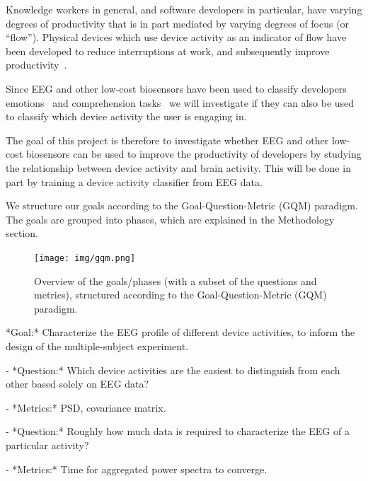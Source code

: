 \documentclass{IEEEtran}
\begin{document}
\begin{refsection}

Knowledge workers in general, and software developers in particular, have varying degrees of productivity that is in part mediated by varying degrees of focus (or ``flow''). Physical devices which use device activity as an indicator of flow have been developed to reduce interruptions at work, and subsequently improve productivity~\cite{zuger_reducing_2017}.


Since EEG and other low-cost biosensors have been used to classify developers emotions~\cite{girardi_recognizing_2020} and comprehension tasks~\cite{fucci_replication_2019} we will investigate if they can also be used to classify which device activity the user is engaging in.

The goal of this project is therefore to investigate whether EEG and other low-cost biosensors can be used to improve the productivity of developers by studying the relationship between device activity and brain activity. This will be done in part by training a device activity classifier from EEG data. %

We structure our goals according to the Goal-Question-Metric (GQM) paradigm. The goals are grouped into phases, which are explained in the Methodology section.

\begin{figure}[h]
\centering
\texttt{[image: img/gqm.png]}
    \caption{Overview of the goals/phases (with a subset of the questions and metrics), structured according to the Goal-Question-Metric (GQM) paradigm.}\label{fig:gqm}
\end{figure}

\begin{markdown}
*Goal:* Characterize the EEG profile of different device activities, to inform the design of the multiple-subject experiment.

 - *Question:* Which device activities are the easiest to distinguish from each other based solely on EEG data?

    - *Metrics:* PSD, covariance matrix.

 - *Question:* Roughly how much data is required to characterize the EEG of a particular activity?

    - *Metrics:* Time for aggregated power spectra to converge.


\end{markdown}
\end{refsection}
\end{document}

